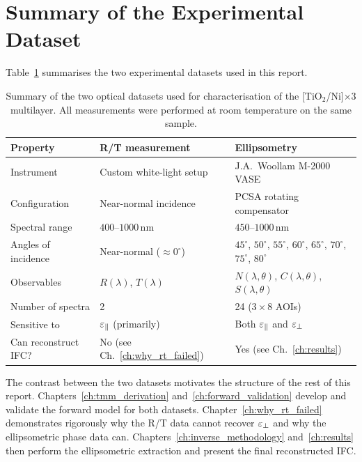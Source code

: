 \section{Summary of the Experimental Dataset}

Table~\ref{tab:ch4_dataset} summarises the two experimental datasets used in
this report.

\begin{table}[h]
\centering
\caption{Summary of the two optical datasets used for characterisation of the
  [TiO$_2$/Ni]$\times$3 multilayer. All measurements were performed at room
  temperature on the same sample.}
\label{tab:ch4_dataset}
\begin{tabular}{lll}
\toprule
Property & R/T measurement & Ellipsometry \\
\midrule
Instrument          & Custom white-light setup  & J.A.\ Woollam M-2000 VASE \\
Configuration       & Near-normal incidence     & PCSA rotating compensator \\
Spectral range      & $400$--$1000$\,nm         & $450$--$1000$\,nm \\
Angles of incidence & Near-normal ($\approx 0^\circ$) & $45^\circ$, $50^\circ$, $55^\circ$,
                                                           $60^\circ$, $65^\circ$, $70^\circ$,
                                                           $75^\circ$, $80^\circ$ \\
Observables         & $R(\lambda)$, $T(\lambda)$ & $N(\lambda,\theta)$, $C(\lambda,\theta)$,
                                                   $S(\lambda,\theta)$ \\
Number of spectra   & 2                         & 24 ($3\times 8$ AOIs) \\
Sensitive to        & $\varepsilon_{\parallel}$ (primarily)       & Both $\varepsilon_{\parallel}$ and $\varepsilon_{\perp}$ \\
Can reconstruct IFC?& No (see Ch.~\ref{ch:why_rt_failed}) & Yes (see Ch.~\ref{ch:results}) \\
\bottomrule
\end{tabular}
\end{table}

The contrast between the two datasets motivates the structure of the rest of
this report. Chapters~\ref{ch:tmm_derivation} and~\ref{ch:forward_validation}
develop and validate the forward model for both datasets.
Chapter~\ref{ch:why_rt_failed} demonstrates rigorously why the R/T data cannot
recover $\varepsilon_{\perp}$ and why the ellipsometric phase data can.
Chapters~\ref{ch:inverse_methodology} and~\ref{ch:results} then perform the
ellipsometric extraction and present the final reconstructed IFC.

